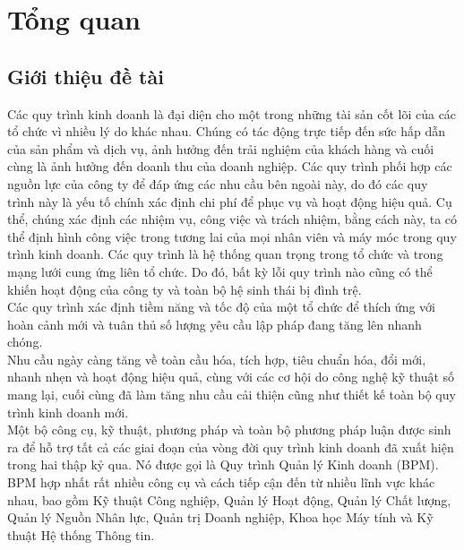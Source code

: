 \section{Tổng quan}
    \subsection{Giới thiệu đề tài}
    
        \hspace{0.5cm}Các quy trình kinh doanh là đại diện cho một trong những tài sản cốt lõi của các tổ chức vì nhiều lý do khác nhau. Chúng có tác động trực tiếp đến sức hấp dẫn của sản phẩm và dịch vụ, ảnh hưởng đến trải nghiệm của khách hàng và cuối cùng là ảnh hưởng đến doanh thu của doanh nghiệp. Các quy trình phối hợp các nguồn lực của công ty để đáp ứng các nhu cầu bên ngoài này, do đó các quy trình này là yếu tố chính xác định chi phí để phục vụ và hoạt động hiệu quả. Cụ thể, chúng xác định các nhiệm vụ, công việc và trách nhiệm, bằng cách này, ta có thể định hình công việc trong tương lai của mọi nhân viên và máy móc trong quy trình kinh doanh. Các quy trình là hệ thống quan trọng trong tổ chức và trong mạng lưới cung ứng liên tổ chức. Do đó, bất kỳ lỗi quy trình nào cũng có thể khiến hoạt động của công ty và toàn bộ hệ sinh thái bị đình trệ. \\

        Các quy trình xác định tiềm năng và tốc độ của một tổ chức để thích ứng với hoàn cảnh mới và tuân thủ số lượng yêu cầu lập pháp đang tăng lên nhanh chóng.\\
        
        Nhu cầu ngày càng tăng về toàn cầu hóa, tích hợp, tiêu chuẩn hóa, đổi mới, nhanh nhẹn và hoạt động hiệu quả, cùng với các cơ hội do công nghệ kỹ thuật số mang lại, cuối cùng đã làm tăng nhu cầu cải thiện  cũng như thiết kế toàn bộ quy trình kinh doanh mới.\\
        
        Một bộ công cụ, kỹ thuật, phương pháp và toàn bộ phương pháp luận được sinh ra để hỗ trợ tất cả các giai đoạn của vòng đời quy trình kinh doanh đã xuất hiện trong hai thập kỷ qua. Nó được gọi là Quy trình Quản lý Kinh doanh (BPM). BPM hợp nhất rất nhiều công cụ và cách tiếp cận đến từ nhiều lĩnh vực khác nhau, bao gồm Kỹ thuật Công nghiệp, Quản lý Hoạt động, Quản lý Chất lượng, Quản lý Nguồn Nhân lực, Quản trị Doanh nghiệp, Khoa học Máy tính và Kỹ thuật Hệ thống Thông tin.\\
        
